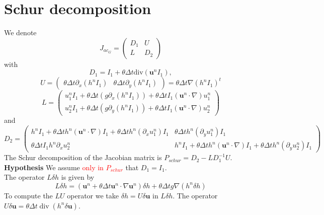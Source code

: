 \documentclass[a4paper, 11pt]{article}
\begin{document}
\section{Schur decomposition}

We denote 
\begin{equation*}
J_{ac_G}=\begin{pmatrix}D_1&U\\L&D_2\end{pmatrix}
\end{equation*}
with
\begin{equation*}
D_1=I_1+\theta\Delta t\text{div}(\boldsymbol{u}^nI_1),
\end{equation*}
\begin{equation*}
U=\begin{pmatrix}\theta\Delta t\partial_x\left(h^nI_1\right)&\theta\Delta t\partial_y\left(h^nI_1\right)\end{pmatrix}=\theta\Delta t\nabla\left(h^nI_1\right)^t
\end{equation*}
\begin{equation*}
L=\begin{pmatrix}
u_1^nI_1+\theta\Delta t (g \partial_x (h^n I_1) )+\theta\Delta tI_1\left(\boldsymbol{u}^n\cdot\nabla\right)u_1^n\\
u_2^nI_1+\theta\Delta t (g \partial_y (h^n I_1) )+\theta\Delta tI_1\left(\boldsymbol{u}^n\cdot\nabla\right)u_2^n
\end{pmatrix}
\end{equation*}
and
\begin{equation*}
D_2=\begin{pmatrix}h^nI_1+\theta\Delta th^n\left(\boldsymbol{u}^n\cdot \nabla\right)I_1+\theta\Delta th^n(\partial_xu_1^n)I_1&\theta\Delta th^n(\partial_yu_1^n)I_1\\
\theta\Delta tI_1h^n\partial_xu_2^n&h^nI_1+\theta\Delta th^n\left(\boldsymbol{u}^n\cdot\nabla\right)I_1+\theta\Delta th^n(\partial_yu_2^n)I_1
\end{pmatrix}
\end{equation*}
The Schur decomposition of the Jacobian matrix is $P_{schur}=D_2-LD_1^{-1}U$.\\
\textbf{Hypothesis} We assume \textcolor{red}{only in $P_{schur}$} that $D_1=I_1$.\\

The operator $L \delta h$ is given by
$$
L \delta h =(\boldsymbol{u}^n+\theta \Delta t \boldsymbol{u}^n\cdot \nabla \boldsymbol{u}^n )\delta h+\theta \Delta t g \nabla( h^n\delta h)
$$
To compute the $LU$ operator we take $\delta h=U\delta \boldsymbol{u}$ in $L \delta h$. The operator $U\delta \boldsymbol{u}=\theta \Delta t \operatorname{div}(h^n \delta \boldsymbol{u})$.
\end{document}
